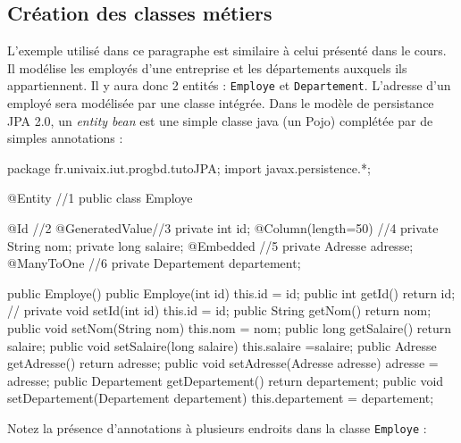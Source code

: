 \documentclass[a4paper,11pt]{article}
\begin{document}
\subsection{Création des classes métiers}
L'exemple utilisé dans ce paragraphe est similaire à celui présenté dans le cours. Il modélise les employés d'une 
entreprise et les départements auxquels ils appartiennent. Il y aura donc 2 entités : \texttt{Employe} et 
\texttt{Departement}. L'adresse d'un employé sera modélisée par une classe intégrée. Dans le modèle de persistance 
JPA 2.0, un \emph{entity bean} est une simple classe java (un Pojo) complétée par de simples annotations :
\begin{code_java}
package fr.univaix.iut.progbd.tutoJPA;
import javax.persistence.*;

@Entity //1
public class Employe {
	@Id //2
	@GeneratedValue//3
	private int id;
	@Column(length=50) //4
	private String nom;
	private long salaire;
	@Embedded //5
	private Adresse adresse;
	@ManyToOne //6
	private Departement departement;
	
	public Employe() {}
	public Employe(int id) { this.id = id; }
	public int getId() { return id; }
	// private void setId(int id) { this.id = id; }
	public String getNom() { return nom; }
	public void setNom(String nom) { this.nom = nom; }
	public long getSalaire() { return salaire; }
	public void setSalaire(long salaire) { this.salaire =salaire; }
	public Adresse getAdresse() { return adresse; }
	public void setAdresse(Adresse adresse) { adresse = adresse; }
	public Departement getDepartement() { return departement; }
	public void setDepartement(Departement departement) { 
		this.departement = departement; 
	}
}
\end{code_java}
Notez la présence d'annotations à plusieurs endroits dans la classe \texttt{Employe} :
\end{document}
